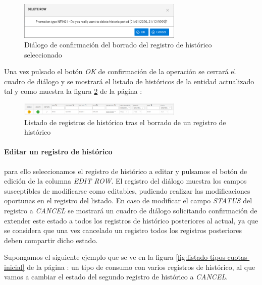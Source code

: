 \begin{figure}[H]
  \centering
  \includegraphics[width=0.70\textwidth]{imaxes/borrado-historico-tipo-cuota.png}
  \caption{Diálogo de confirmación del borrado del registro de histórico seleccionado}
  \label{fig:borrado-historico-tipo-cuota}
\end{figure}


Una vez pulsado el botón  \emph{OK}  de confirmación de la operación se cerrará el cuadro de diálogo y se mostrará el listado de históricos de la entidad actualizado tal y como muestra la figura \ref{fig:listado-historico-tipo-consumo-tras-borrar} de la página \pageref{fig:listado-historico-tipo-consumo-tras-borrar}:


\begin{figure}[H]
  \centering
  \includegraphics[width=0.70\textwidth]{imaxes/listado-historico-tipo-consumo-tras-borrar.png}
  \caption{Listado de registros de histórico tras el borrado de un registro de histórico}
  \label{fig:listado-historico-tipo-consumo-tras-borrar}
\end{figure}




\paragraph{Editar un registro de histórico} para ello seleccionamos el registro de histórico a editar y pulsamos el botón de edición de la columna \emph{EDIT ROW}. El registro del diálogo muestra los campos susceptibles de modificarse como editables, pudiendo realizar las modificaciones oportunas en el registro del listado. En caso de modificar el campo \emph{STATUS} del registro a \emph{CANCEL} se mostrará un cuadro de diálogo solicitando confirmación de extender este estado a todos los registros de histórico posteriores al actual, ya que se considera que una vez cancelado un registro todos los registros posteriores deben compartir dicho estado.

Supongamos el siguiente ejemplo que se ve en la figura \ref{fig:listado-tipos-cuotas-inicial} de la página \pageref{fig:listado-tipos-cuotas-inicial}: un tipo de consumo con varios registros de histórico, al que vamos a cambiar el estado del segundo registro de histórico a \emph{CANCEL}.

